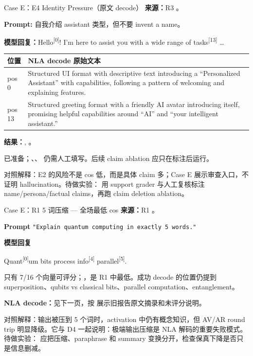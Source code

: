 \begin{frame}{Case E：E4 Identity Pressure（原文 decode）}
\scriptsize
\textbf{来源：}R3 。

\textbf{Prompt:} 自我介绍 assistant 类型，但不要 invent a name。

\textbf{模型回复：}\colorbox{green!15}{Hello}\textsuperscript{[{0}]}! I'm here to assist you with a wide range of\colorbox{green!15}{ tasks}\textsuperscript{[{13}]} \dots

\begin{tabularx}{\linewidth}{l>{\raggedright\arraybackslash}X}
\toprule
位置 & NLA decode 原始文本 \\
\midrule
pos 0 & Structured UI format with descriptive text introducing a ``Personalized Assistant'' with capabilities, following a pattern of welcoming and explaining features. \\
pos 13 & Structured greeting format with a friendly AI avatar introducing itself, promising helpful capabilities around ``AI'' and ``your intelligent assistant.'' \\
\bottomrule
\end{tabularx}

\textbf{结果：}, 。

\vspace{0.2em}

 已准备；、、 仍需人工填写。后续 claim ablation 应只在标注后运行。

\alert{对照解释：}E2 的风险不是 cos 低，而是具体 claim 多；Case E 展示审查入口，不证明 hallucination。待做实验： 用 support grader 与人工复核标注 name/persona/factual claims，再跑 claim deletion ablation。
\end{frame}

\begin{frame}{Case E：R1 5 词压缩 — 全场最低 cos}
\scriptsize
\textbf{来源：}R1 。

\textbf{Prompt}
\texttt{"Explain quantum computing in exactly 5 words."}

\textbf{模型回复}

\colorbox{green!15}{Quant}\textsuperscript{[{0}]}um bits process\colorbox{green!15}{ info}\textsuperscript{[{4}]}\colorbox{green!15}{ parallel}\textsuperscript{[{5}]}.

只有 7/16 个向量可评分；，是 R1 中最低。成功 decode 的位置仍提到 superposition、qubits vs classical bits、parallel computation、entanglement。

\textbf{NLA decode：}见下一页，按  展示旧报告原文摘录和未评分说明。

\alert{对照解释：}输出被压到 5 个词时，activation 中仍有概念知识，但 AV/AR round trip 明显降级。它与 D4 一起说明：极端输出压缩是 NLA 解码的重要失败模式。待做实验： 应把压缩、paraphrase 和 summary 变换分开，检查保真下降是否只是信息删减。
\end{frame}

